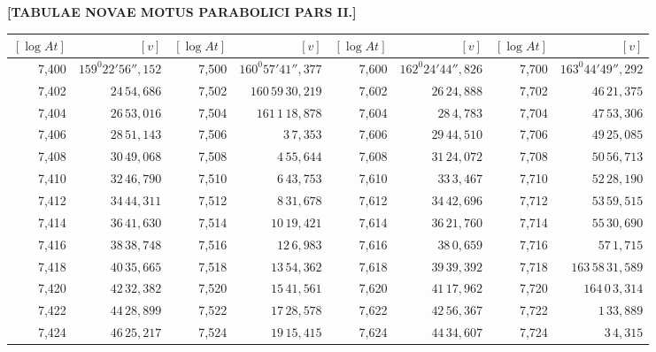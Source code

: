 \clearpage
{}
\begingroup
\centering
\fontsize{9}{9}\selectfont
\setlength{\tabcolsep}{.2pt}
\renewcommand{\arraystretch}{.9}
\setlength{\parskip}{0pt}
\textbf{[TABULAE NOVAE MOTUS PARABOLICI PARS II.]}
\par\vspace{7pt}
\begin{tabular}{|r|r||r|r||r|r||r|r|}
\hline
\([\log At]\) & \([v]\) & \([\log At]\) & \([v]\) & \([\log At]\) & \([v]\) & \([\log At]\) & \([v]\) \\
\hline
7,400 & \(159^{0}22'56'',\!152\) & 7,500 & \(160^{0}57'41'',\!377\) & 7,600 & \(162^{0}24'44'',\!826\) & 7,700 & \(163^{0}44'49'',\!292\) \\[1pt]
7,402 & \(24\,54,\!686\) & 7,502 & \(160\,59\,30,\!219\) & 7,602 & \(26\,24,\!888\) & 7,702 & \(46\,21,\!375\) \\
7,404 & \(26\,53,\!016\) & 7,504 & \(161\,1\,18,\!878\) & 7,604 & \(28\,4,\!783\) & 7,704 & \(47\,53,\!306\) \\
7,406 & \(28\,51,\!143\) & 7,506 & \(3\,7,\!353\) & 7,606 & \(29\,44,\!510\) & 7,706 & \(49\,25,\!085\) \\
7,408 & \(30\,49,\!068\) & 7,508 & \(4\,55,\!644\) & 7,608 & \(31\,24,\!072\) & 7,708 & \(50\,56,\!713\) \\
7,410 & \(32\,46,\!790\) & 7,510 & \(6\,43,\!753\) & 7,610 & \(33\,3,\!467\) & 7,710 & \(52\,28,\!190\) \\[1pt]
7,412 & \(34\,44,\!311\) & 7,512 & \(8\,31,\!678\) & 7,612 & \(34\,42,\!696\) & 7,712 & \(53\,59,\!515\) \\
7,414 & \(36\,41,\!630\) & 7,514 & \(10\,19,\!421\) & 7,614 & \(36\,21,\!760\) & 7,714 & \(55\,30,\!690\) \\
7,416 & \(38\,38,\!748\) & 7,516 & \(12\,6,\!983\) & 7,616 & \(38\,0,\!659\) & 7,716 & \(57\,1,\!715\) \\
7,418 & \(40\,35,\!665\) & 7,518 & \(13\,54,\!362\) & 7,618 & \(39\,39,\!392\) & 7,718 & \(163\,58\,31,\!589\) \\
7,420 & \(42\,32,\!382\) & 7,520 & \(15\,41,\!561\) & 7,620 & \(41\,17,\!962\) & 7,720 & \(164\,0\,3,\!314\) \\[1pt]
7,422 & \(44\,28,\!899\) & 7,522 & \(17\,28,\!578\) & 7,622 & \(42\,56,\!367\) & 7,722 & \(1\,33,\!889\) \\
7,424 & \(46\,25,\!217\) & 7,524 & \(19\,15,\!415\) & 7,624 & \(44\,34,\!607\) & 7,724 & \(3\,4,\!315\) \\

\end{tabular}
